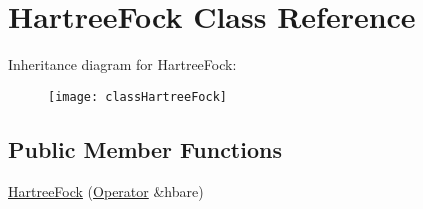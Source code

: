 \hypertarget{classHartreeFock}{\section{Hartree\-Fock Class Reference}
\label{classHartreeFock}
}
Inheritance diagram for Hartree\-Fock\-:\begin{figure}[H]
\begin{center}
\leavevmode
\texttt{[image: classHartreeFock]}
\end{center}
\end{figure}
\subsection*{Public Member Functions}
\begin{DoxyCompactItemize}
\item 
\hypertarget{classHartreeFock_ad39d695b75dc9c6aa2f0e1ff81d1adc5}{\hyperlink{classHartreeFock_ad39d695b75dc9c6aa2f0e1ff81d1adc5}{Hartree\-Fock} (\hyperlink{classOperator}{Operator} \&hbare)}\label{classHartreeFock_ad39d695b75dc9c6aa2f0e1ff81d1adc5}


\end{DoxyCompactItemize}
